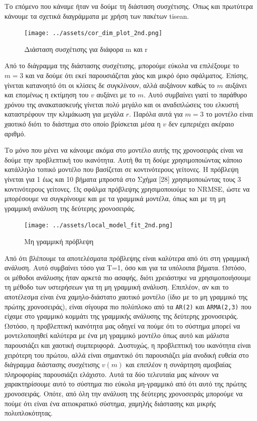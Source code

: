 \documentclass[11pt,]{article}
\begin{document}
Το επόμενο που κάναμε ήταν να δούμε τη διάσταση συσχέτισης. Όπως και
πρωτύτερα κάνουμε τα σχετικά διαγράμματα με χρήση των πακέτων tisean.

\begin{figure}
\centering
\texttt{[image: ../assets/cor\_dim\_plot\_2nd.png]}
\caption{Διάσταση συσχέτισης για διάφορα m και r}
\end{figure}

Από το διάγραμμα της διάστασης συσχέτισης, μπορούμε εύκολα να επιλέξουμε
το \(m=3\) και να δούμε ότι εκεί παρουσιάζεται χάος και μικρό όριο
σφάλματος. Επίσης, γίνεται κατανοητό ότι οι κλίσεις δε συγκλίνουν, αλλά
αυξάνουν καθώς το \(m\) αυξάνει και επομένως η εκτίμηση του \(v\)
αυξάνει με το \(m\). Αυτό συμβαίνει γιατί το παράθυρο χρόνου της
ανακατασκευής γίνεται πολύ μεγάλο και οι αναδιπλώσεις του ελκυστή
καταστρέφουν την κλιμάκωση για μεγάλα \(r\). Παρόλα αυτά για \(m=3\) το
μοντέλο είναι χαοτικό διότι το διάστημα στο οποίο βρίσκεται μέσα η \(v\)
δεν εμπεριέχει ακέραιο αριθμό.

Το μόνο που μένει να κάνουμε ακόμα στο μοντέλο αυτής της χρονοσειράς
είναι να δούμε την προβλεπτική του ικανότητα. Αυτή θα τη δούμε
χρησιμοποιώντας κάποιο κατάλληλο τοπικό μοντέλο που βασίζεται σε
κοντινότερους γείτονες. Η πρόβλεψη γίνεται για 1 έως και 10 βήματα
μπροστά στο Σχήμα {[}28{]} χρησιμοποιώντας τους 3 κοντινότερους
γείτονες. Ως σφάλμα πρόβλεψης χρησιμοποιούμε το NRMSE, ώστε να
μπορέσουμε να συγκρίνουμε και με τα γραμμικά μοντέλα, όπως και με τη μη
γραμμική ανάλυση της δεύτερης χρονοσειράς.

\begin{figure}
\centering
\texttt{[image: ../assets/local\_model\_fit\_2nd.png]}
\caption{Μη γραμμική πρόβλεψη}
\end{figure}

Από ότι βλέπουμε τα αποτελέσματα πρόβλεψης είναι καλύτερα από ότι στη
γραμμική ανάλυση. Αυτό συμβαίνει τόσο για T=1, όσο και για τα υπόλοιπα
βήματα. Ωστόσο, οι μέθοδοι ανάλυσης ήταν αρκετά πιο ασαφής, διότι
χρειάστηκε να χρησιμοποιήσουμε τη μέθοδο των υστερήσεων για τη μη
γραμμική ανάλυση. Επιπλέον, αν και το αποτέλεσμα είναι ένα
χαμηλο-διάστατο χαοτικό μοντέλο (ίδιο με το μη γραμμικό της πρώτης
χρονοσειράς), είναι σίγουρα πιο πολύπλοκο από τα \texttt{AR(2)} και
\texttt{ARMA(2,3)} που είχαμε στο γραμμικό κομμάτι της γραμμικής
ανάλυσης της δεύτερης χρονοσειράς. Ωστόσο, η προβλεπτική ικανότητα μας
οδηγεί να πούμε ότι το σύστημα μπορεί να μοντελοποιηθεί καλύτερα με ένα
μη γραμμικό μοντέλο όπως αυτό και μάλιστα παρουσιάζει και χαοτική
συμπεριφορά. Δυστυχώς, η προβλεπτική του ικανότητα είναι χειρότερη του
πρώτου, αλλά είναι σημαντικό ότι παρουσιάζει μία ανοδική ευθεία στο
διάγραμμα διάστασης συσχέτισης \(v(m)\) και επιπλέον η συνάρτηση
αμοιβαίας πληροφορίας παρουσιάζει ελάχιστο. Αυτά τα δύο τελευταία μας
κάνουν να χαρακτηρίσουμε αυτό το σύστημα πιο εύκολα μη-γραμμικό από ότι
αυτό της πρώτης χρονοσειράς. Οπότε, από όλη την ανάλυση της δεύτερης
χρονοσειράς μπορούμε να πούμε ότι είναι ένα αιτιοκρατικό σύστημα,
χαμηλής διάστασης και μικρής πολυπλοκότητας.
\end{document}

